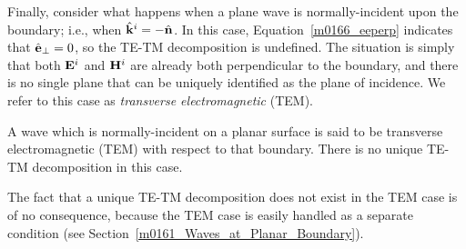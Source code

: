 Finally, consider what happens when a plane wave is normally-incident upon the boundary; i.e., when $\hat{\bf k}^i=-\hat{\bf n}$.  
In this case, Equation~\ref{m0166_eeperp} indicates that $\hat{\bf e}_{\perp}=0$, so the TE-TM decomposition is undefined.
The situation is simply that both ${\bf E}^i$ and ${\bf H}^i$ are already both perpendicular to the boundary, and there is no single plane that can be uniquely identified as the plane of incidence.
We refer to this case as \emph{transverse electromagnetic} (TEM).
\begin{mdframed}[backgroundcolor=yellow!20,nobreak=true] 
A wave which is normally-incident on a planar surface is said to be transverse electromagnetic (TEM) 
with respect to that boundary.  There is no unique TE-TM decomposition in this case.
\end{mdframed}
The fact that a unique TE-TM decomposition does not exist in the TEM case is of no consequence, because the TEM case is easily handled as a separate condition (see Section~\ref{m0161_Waves_at_Planar_Boundary}).


